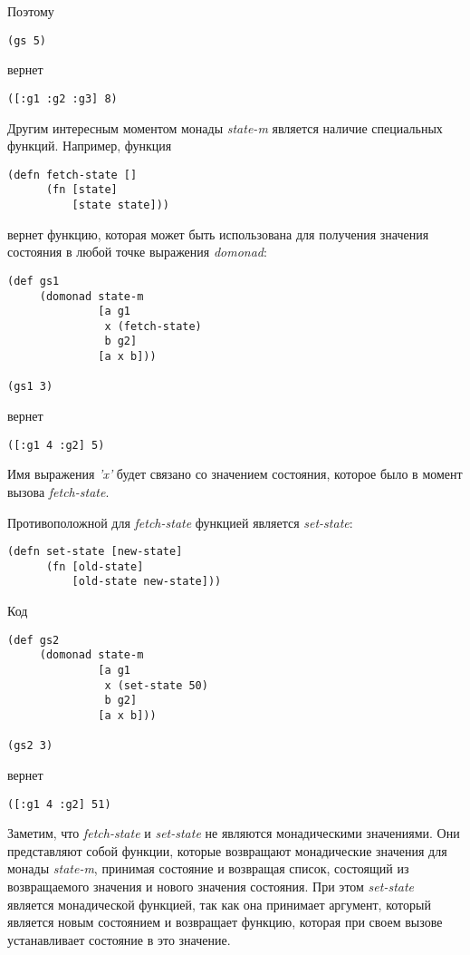 \documentclass[a4paper,12pt]{article}
\newcommand{\cl}[1] {{\it #1}}
\begin{document}
Поэтому 

\begin{verbatim}
(gs 5)
\end{verbatim}

вернет

\begin{verbatim}
([:g1 :g2 :g3] 8)
\end{verbatim}

Другим интересным моментом монады \cl{state-m} является наличие специальных функций.
Например, функция

\begin{verbatim}
(defn fetch-state []
      (fn [state]
          [state state]))
\end{verbatim}
вернет функцию, которая может быть использована для получения значения состояния
в любой точке выражения \cl{domonad}:

\begin{verbatim}
(def gs1
     (domonad state-m
              [a g1
               x (fetch-state)
               b g2]
              [a x b]))

(gs1 3)
\end{verbatim}
вернет
\begin{verbatim}
([:g1 4 :g2] 5)
\end{verbatim}

Имя выражения \cl{'x'} будет связано со значением состояния, которое было в момент вызова \cl{fetch-state}.

Противоположной для \cl{fetch-state} функцией является \cl{set-state}:

\begin{verbatim}
(defn set-state [new-state]
      (fn [old-state]
          [old-state new-state]))
\end{verbatim}

Код 

\begin{verbatim}
(def gs2
     (domonad state-m
              [a g1
               x (set-state 50)
               b g2]
              [a x b]))

(gs2 3)
\end{verbatim}
вернет

\begin{verbatim}
([:g1 4 :g2] 51)
\end{verbatim}

Заметим, что \cl{fetch-state} и \cl{set-state} не являются монадическими значениями. Они 
представляют собой функции, которые возвращают монадические значения для монады \cl{state-m}, принимая
состояние и возвращая список, состоящий из возвращаемого значения и нового значения состояния. При этом
\cl{set-state} является монадической функцией, так как она принимает аргумент, который является новым состоянием
и возвращает функцию, которая при своем вызове устанавливает состояние в это значение. 
\end{document}
